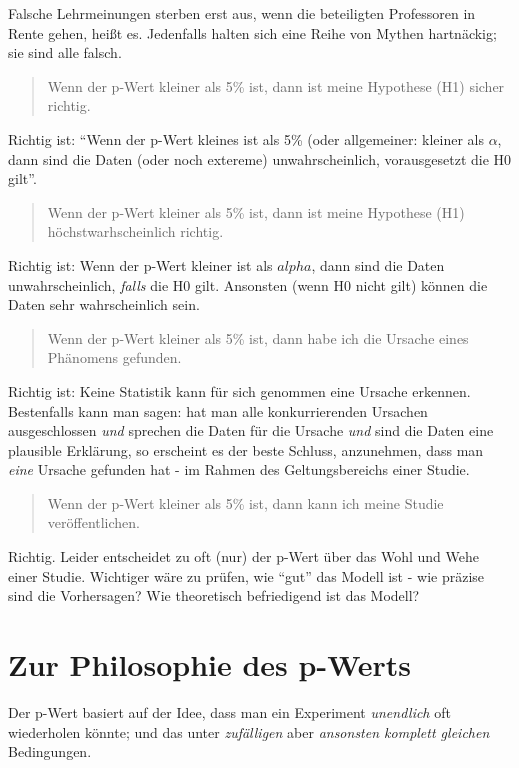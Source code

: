 \documentclass[12pt,ngerman,]{book}
\begin{document}
Falsche Lehrmeinungen sterben erst aus, wenn die beteiligten Professoren
in Rente gehen, heißt es. Jedenfalls halten sich eine Reihe von Mythen
hartnäckig; sie sind alle falsch.

\begin{quote}
Wenn der p-Wert kleiner als 5\% ist, dann ist meine Hypothese (H1)
sicher richtig.
\end{quote}

Richtig ist: ``Wenn der p-Wert kleines ist als 5\% (oder allgemeiner:
kleiner als \(\alpha\), dann sind die Daten (oder noch extereme)
unwahrscheinlich, vorausgesetzt die H0 gilt''.

\begin{quote}
Wenn der p-Wert kleiner als 5\% ist, dann ist meine Hypothese (H1)
höchstwarhscheinlich richtig.
\end{quote}

Richtig ist: Wenn der p-Wert kleiner ist als \(alpha\), dann sind die
Daten unwahrscheinlich, \emph{falls} die H0 gilt. Ansonsten (wenn H0
nicht gilt) können die Daten sehr wahrscheinlich sein.

\begin{quote}
Wenn der p-Wert kleiner als 5\% ist, dann habe ich die Ursache eines
Phänomens gefunden.
\end{quote}

Richtig ist: Keine Statistik kann für sich genommen eine Ursache
erkennen. Bestenfalls kann man sagen: hat man alle konkurrierenden
Ursachen ausgeschlossen \emph{und} sprechen die Daten für die Ursache
\emph{und} sind die Daten eine plausible Erklärung, so erscheint es der
beste Schluss, anzunehmen, dass man \emph{eine} Ursache gefunden hat -
im Rahmen des Geltungsbereichs einer Studie.

\begin{quote}
Wenn der p-Wert kleiner als 5\% ist, dann kann ich meine Studie
veröffentlichen.
\end{quote}

Richtig. Leider entscheidet zu oft (nur) der p-Wert über das Wohl und
Wehe einer Studie. Wichtiger wäre zu prüfen, wie ``gut'' das Modell ist
- wie präzise sind die Vorhersagen? Wie theoretisch befriedigend ist das
Modell?

\section{Zur Philosophie des p-Werts}\label{zur-philosophie-des-p-werts}

Der p-Wert basiert auf der Idee, dass man ein Experiment
\emph{unendlich} oft wiederholen könnte; und das unter \emph{zufälligen}
aber \emph{ansonsten komplett gleichen} Bedingungen.
\end{document}
